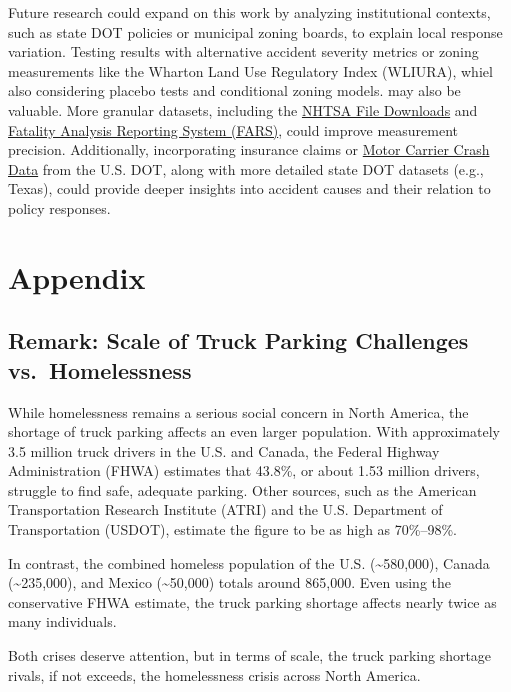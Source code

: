 \documentclass[
  12pt]{article}
\begin{document}
Future research could expand on this work by analyzing institutional
contexts, such as state DOT policies or municipal zoning boards, to
explain local response variation. Testing results with alternative
accident severity metrics or zoning measurements like the Wharton Land
Use Regulatory Index (WLIURA), whiel also considering placebo tests and
conditional zoning models. \citep{gyourkoNewMeasureLocal2008} may also
be valuable. More granular datasets, including the
\href{https://www.nhtsa.gov/file-downloads}{NHTSA File Downloads} and
\href{https://www.nhtsa.gov/research-data/fatality-analysis-reporting-system-fars}{Fatality
Analysis Reporting System (FARS)}, could improve measurement precision.
Additionally, incorporating insurance claims or
\href{https://data.transportation.gov/Trucking-and-Motorcoaches/Motor-Carrier-Crash-Data-/b8e5-isfj}{Motor
Carrier Crash Data} from the U.S. DOT, along with more detailed state
DOT datasets (e.g., Texas), could provide deeper insights into accident
causes and their relation to policy responses.

\section{\texorpdfstring{\textbf{Appendix}}{Appendix}}\label{appendix}

\subsection{Remark: Scale of Truck Parking Challenges
vs.~Homelessness}\label{remark-scale-of-truck-parking-challenges-vs.-homelessness}

While homelessness remains a serious social concern in North America,
the shortage of truck parking affects an even larger population. With
approximately 3.5 million truck drivers in the U.S. and Canada, the
Federal Highway Administration (FHWA) estimates that 43.8\%, or about
1.53 million drivers, struggle to find safe, adequate parking. Other
sources, such as the American Transportation Research Institute (ATRI)
and the U.S. Department of Transportation (USDOT), estimate the figure
to be as high as 70\%--98\%.

In contrast, the combined homeless population of the U.S.
(\textasciitilde580,000), Canada (\textasciitilde235,000), and Mexico
(\textasciitilde50,000) totals around 865,000. Even using the
conservative FHWA estimate, the truck parking shortage affects nearly
twice as many individuals.

Both crises deserve attention, but in terms of scale, the truck parking
shortage rivals, if not exceeds, the homelessness crisis across North
America.
\end{document}
